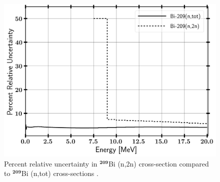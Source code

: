 \begin{figure}[htb!]
	\includegraphics[width=0.9\linewidth]{Figures/Chapter2/Bi_209_RelUncert.png}
	\caption[Percent relative uncertainty in $\mathrm{^{209}}$Bi (n,2n) cross-section compared to $\mathrm{^{209}}$Bi (n,tot) cross-sections]{Percent relative uncertainty in $\mathbf{^{209}}$Bi (n,2n) cross-section compared to $\mathbf{^{209}}$Bi (n,tot) cross-sections \cite{ENDF}.}
	\label{fig:Bi209rel}
\end{figure}

